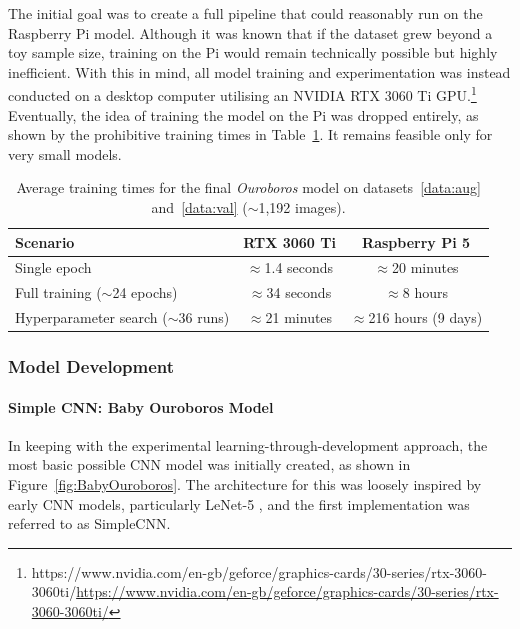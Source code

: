             The initial goal was to create a full pipeline that could reasonably run on the Raspberry Pi model. Although it was known that if the dataset grew beyond a toy sample size, training on the Pi would remain technically possible but highly inefficient. With this in mind, all model training and experimentation was instead conducted on a desktop computer utilising an NVIDIA RTX 3060 Ti GPU.\footnote{https://www.nvidia.com/en-gb/geforce/graphics-cards/30-series/rtx-3060-3060ti/\url{https://www.nvidia.com/en-gb/geforce/graphics-cards/30-series/rtx-3060-3060ti/}} Eventually, the idea of training the model on the Pi was dropped entirely, as shown by the prohibitive training times in Table~\ref{tab:trainingTimes}. It remains feasible only for very small models.
    
            \begin{table}[H]
                \centering
                \begin{tabular}{lcc}
                    \toprule
                    \textbf{Scenario} & \textbf{RTX 3060 Ti} & \textbf{Raspberry Pi 5} \\
                    \midrule
                    Single epoch        & $\approx$1.4 seconds     & $\approx$20 minutes \\
                    Full training ($\sim$24 epochs) & $\approx$34 seconds     & $\approx$8 hours \\
                    Hyperparameter search ($\sim$36 runs) & $\approx$21 minutes     & $\approx$216 hours (9 days) \\
                    \bottomrule
                \end{tabular}
                \caption{Average training times for the final \textit{Ouroboros} model on datasets~\ref{data:aug} and~\ref{data:val} ($\sim$1,192 images).}
                \label{tab:trainingTimes}
            \end{table}
    
            \subsubsection{Model Development}
            
            \paragraph{Simple CNN: Baby Ouroboros Model}
    
                In keeping with the experimental learning-through-development approach, the most basic possible CNN model was initially created, as shown in Figure~\ref{fig:BabyOuroboros}. The architecture for this was loosely inspired by early CNN models, particularly LeNet-5 \cite{726791}, and the first implementation was referred to as SimpleCNN.
    
